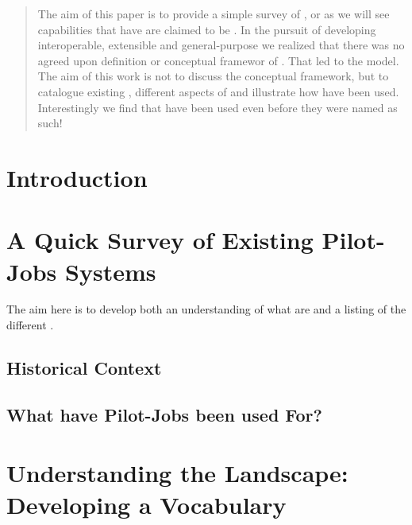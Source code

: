\documentclass{sig-alternate}
\begin{document}
\date{}
\maketitle

\begin{abstract} 
 The aim of this paper is to provide a simple survey of \pilotjobs,
  or as we will see capabilities that have are claimed to be
  \pilotjobs.  In the pursuit of developing interoperable, extensible
  and general-purpose \pilotjobs we realized that there was no agreed
  upon definition or conceptual framewor of \pilotjobs. That led to
  the \pstar model. The aim of this work is not to discuss the \pstar
  conceptual framework, but to catalogue existing \pilotjobs,
  different aspects of \pilotjobs and illustrate how \pilotjobs have
  been used.  Interestingly we find that \pilotjobs have been used
  even before they were named as such!

\end{abstract}

\section{Introduction} 

\section{A  Quick Survey of Existing Pilot-Jobs Systems}

The aim here is to develop both an understanding of what \pilotjobs
are and a listing of the different \pilotjobs.

\subsection{Historical Context}

\subsection{What have Pilot-Jobs been used For?}


\section{Understanding the Landscape: Developing a Vocabulary}

\end{document}
